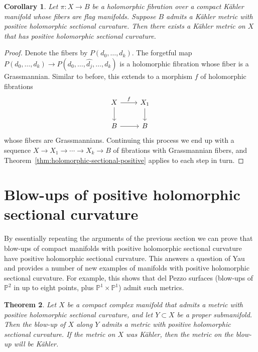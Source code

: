 \documentclass[10pt,a4paper]{amsart}
\newtheorem{theo}{Theorem}[section]
\newtheorem{coro}[theo]{Corollary}
\theoremstyle{definition}
\newcommand{\kk}[1]{\mathbb{#1}}
\def\kahler{K\"ahler}
\begin{document}
\begin{coro}
Let $\pi : X \to B$ be a holomorphic fibration over a compact \kahler{} manifold whose fibers are flag manifolds.
Suppose $B$ admits a \kahler{} metric with positive holomorphic sectional curvature.
Then there exists a \kahler{} metric on $X$ that has positive holomorphic sectional curvature.
\end{coro}

\begin{proof}
Denote the fibers by $P(d_{0}, \ldots, d_{k})$.
The forgetful map $P(d_{0}, \ldots, d_{k}) \to P(d_{0}, \ldots, \hat{d_{j}}, \ldots, d_{k})$ is a holomorphic fibration whose fiber is a Grassmannian.
Similar to before, this extends to a morphism $f$ of holomorphic fibrations
\[
\begin{tikzcd}
  X \ar[r,"f"]\ar[d] & X_{1} \ar[d]
  \\
  B \ar[r] & B
\end{tikzcd}
\]
whose fibers are Grassmannians.
Continuing this process we end up with a sequence $X \to X_{1} \to \cdots \to X_{k} \to B$ of fibrations with Grassmannian fibers, and Theorem~\ref{thm:holomorphic-sectional-positive} applies to each step in turn.
\end{proof}




\section{Blow-ups of positive holomorphic sectional curvature}
\label{sec:blow-ups-positive}


By essentially repeating the arguments of the previous section we can prove that blow-ups of compact manifolds with positive holomorphic sectional curvature have positive holomorphic sectional curvature.
This answers a question of Yau~\cite[Problem~67]{yau1993open}
and provides a number of new examples of manifolds with positive holomorphic sectional curvature.
For example, this shows that del Pezzo surfaces (blow-ups of $\kk P^2$ in up to eight points, plus $\kk P^1 \times \kk P^1$) admit such metrics.


\begin{theo}
Let $X$ be a compact complex manifold that admits a metric with positive holomorphic sectional curvature, and let $Y \subset X$ be a proper submanifold.
Then the blow-up of $X$ along $Y$ admits a metric with positive holomorphic sectional curvature.
If the metric on $X$ was \kahler{}, then the metric on the blow-up will be \kahler{}.
\end{theo}
\end{document}
